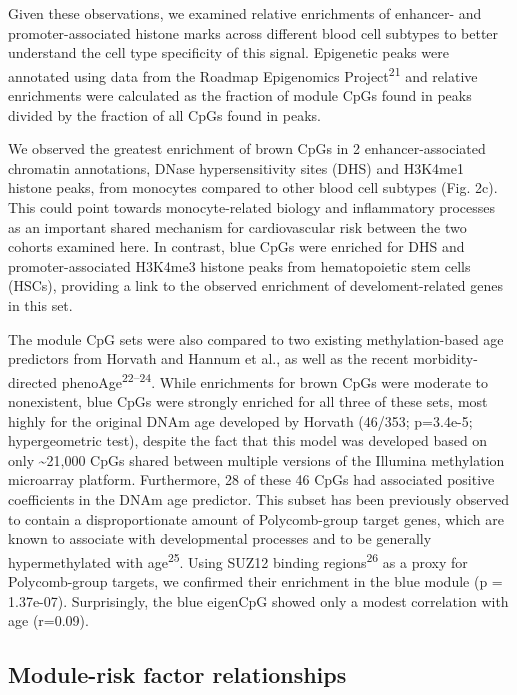 \documentclass[]{article}
\theoremstyle{definition}
\theoremstyle{definition}
\theoremstyle{definition}
\theoremstyle{remark}
\begin{document}
Given these observations, we examined relative enrichments of enhancer-
and promoter-associated histone marks across different blood cell
subtypes to better understand the cell type specificity of this signal.
Epigenetic peaks were annotated using data from the Roadmap Epigenomics
Project\textsuperscript{21} and relative enrichments were calculated as
the fraction of module CpGs found in peaks divided by the fraction of
all CpGs found in peaks.

We observed the greatest enrichment of brown CpGs in 2
enhancer-associated chromatin annotations, DNase hypersensitivity sites
(DHS) and H3K4me1 histone peaks, from monocytes compared to other blood
cell subtypes (Fig. 2c). This could point towards monocyte-related
biology and inflammatory processes as an important shared mechanism for
cardiovascular risk between the two cohorts examined here. In contrast,
blue CpGs were enriched for DHS and promoter-associated H3K4me3 histone
peaks from hematopoietic stem cells (HSCs), providing a link to the
observed enrichment of develoment-related genes in this set.

The module CpG sets were also compared to two existing methylation-based
age predictors from Horvath and Hannum et al., as well as the recent
morbidity-directed phenoAge\textsuperscript{22--24}. While enrichments
for brown CpGs were moderate to nonexistent, blue CpGs were strongly
enriched for all three of these sets, most highly for the original DNAm
age developed by Horvath (46/353; p=3.4e-5; hypergeometric test),
despite the fact that this model was developed based on only
\textasciitilde{}21,000 CpGs shared between multiple versions of the
Illumina methylation microarray platform. Furthermore, 28 of these 46
CpGs had associated positive coefficients in the DNAm age predictor.
This subset has been previously observed to contain a disproportionate
amount of Polycomb-group target genes, which are known to associate with
developmental processes and to be generally hypermethylated with
age\textsuperscript{25}. Using SUZ12 binding regions\textsuperscript{26}
as a proxy for Polycomb-group targets, we confirmed their enrichment in
the blue module (p = 1.37e-07). Surprisingly, the blue eigenCpG showed
only a modest correlation with age (r=0.09).

\subsection{Module-risk factor
relationships}\label{module-risk-factor-relationships}
\end{document}
